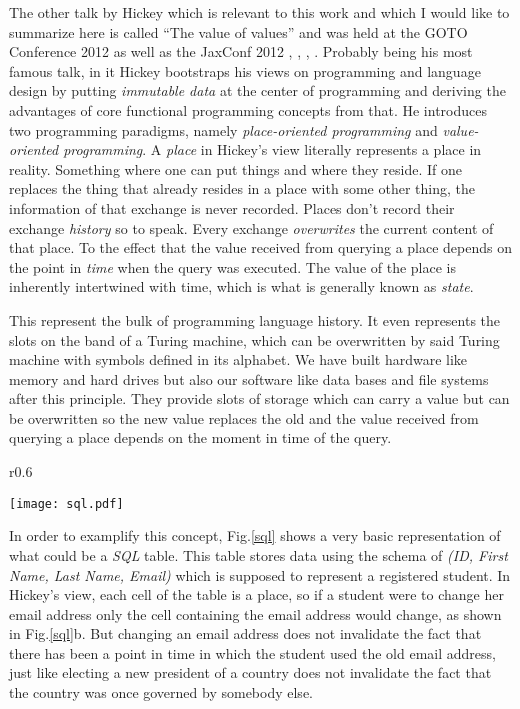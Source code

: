 The other talk by Hickey which is relevant to this work and which
I would like to summarize here is called ``The value of values''
and was held at the GOTO Conference 2012 as well as the JaxConf 2012
\cite{vofv-infoq}, \cite{vofv-yt}, \cite{goto2012}, \cite{jax2012}.
Probably being his most famous talk, in it Hickey bootstraps his
views on programming and language design by putting
\textit{immutable data} at the center of programming and deriving
the advantages of core functional programming concepts from that.
He introduces two programming paradigms,
namely \textit{place-oriented programming} and
\textit{value-oriented programming}. A \textit{place} in Hickey's
view literally represents a place in reality. Something where
one can put things and where they reside. If one replaces the thing
that already resides in a place with some other thing, the
information of that exchange is never recorded. Places don't
record their exchange \textit{history} so to speak. Every exchange
\textit{overwrites} the current content of that place.
To the effect that the value received from querying a place
depends on the point in \textit{time} when the query was executed.
The value of the place is inherently intertwined with time, which
is what is generally known as \textit{state}.

This represent the bulk of programming language history. It
even represents the slots on the band of a Turing machine, which
can be overwritten by said Turing machine with symbols defined in
its alphabet. We have built hardware like memory and hard drives
but also our software like data bases and file systems
after this principle. They provide slots of storage which can
carry a value but can be overwritten so the new value replaces the
old and the value received from querying a place depends on the
moment in time of the query.

\begin{wrapfigure}{r}{0.6\textwidth}

  \texttt{[image: sql.pdf]}
  \caption{Place-orientation examplified by a SQL table, each cell
           being a place.}
  \label{sql}

\end{wrapfigure}

In order to examplify this concept, Fig.\ref{sql} shows a very
basic representation of what could be a \textit{SQL} table.
This table stores data using the schema of \textit{(ID, First Name,
Last Name, Email)} which is supposed to represent a registered
student. In Hickey's view, each cell of the table is a place, so
if a student were to change her email address only the cell containing
the email address would change, as shown in Fig.\ref{sql}b.
But changing an email address does not invalidate the fact that
there has been a point in time in which the student used the
old email address, just like electing a new president of a country
does not invalidate the fact that the country was once governed by
somebody else.

